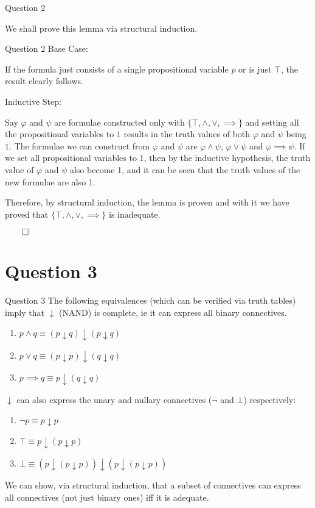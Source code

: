 \documentclass{beamer}
\begin{document}
{\begin{frame}{Question 2}
\begin{enumerate}
                We shall prove this lemma via structural induction.
            \end{enumerate}
        \end{frame}
        \begin{frame}{Question 2}
            Base Case:

            If the formula just consists of a single propositional variable $p$ or is just $\top$, the result clearly follows.

            Inductive Step:

            Say $\varphi$ and $\psi$ are formulae constructed only with $\{\top, \land, \lor, \implies\}$ and setting all the propositional variables to $1$ results in the truth values of both $\varphi$ and $\psi$ being $1$. The formulae we can construct from $\varphi$ and $\psi$ are $\varphi \land \psi$, $\varphi \lor \psi$ and $\varphi \implies \psi$. If we set all propositional variables to 1, then by the inductive hypothesis, the truth value of $\varphi$ and $\psi$ also become 1, and it can be seen that the truth values of the new formulae are also 1.

            Therefore, by structural induction, the lemma is proven and with it we have proved that $\{\top, \land, \lor, \implies\}$ is inadequate.

            $\qed$
        \end{frame}
    }
    \section{Question 3}
    {
        \begin{frame}{Question 3}
            The following equivalences (which can be verified via truth tables) imply that $\downarrow$ (NAND) is complete, ie it can express all binary connectives.
            \begin{enumerate}
                \item $p \land q \equiv (p \downarrow q) \downarrow (p \downarrow q)$
                \item $p \lor q \equiv (p \downarrow p) \downarrow (q \downarrow q)$
                \item $p \implies q \equiv p \downarrow (q \downarrow q)$
            \end{enumerate}
            $\downarrow$ can also express the unary and nullary connectives ($\neg$ and $\bot$) respectively:
            \begin{enumerate}
                \item $\neg p \equiv p \downarrow p$
                \item $\top \equiv p \downarrow (p \downarrow p)$
                \item $\bot \equiv (p \downarrow (p \downarrow p)) \downarrow (p \downarrow (p \downarrow p))$
            \end{enumerate}
            We can show, via structural induction, that a subset of connectives can express all connectives (not just binary ones) iff it is adequate.
        \end{frame}
    }
\end{document}
